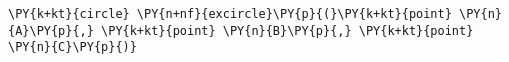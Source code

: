 \begin{Verbatim}[commandchars=\\\{\}]
    \PY{k+kt}{circle} \PY{n+nf}{excircle}\PY{p}{(}\PY{k+kt}{point} \PY{n}{A}\PY{p}{,} \PY{k+kt}{point} \PY{n}{B}\PY{p}{,} \PY{k+kt}{point} \PY{n}{C}\PY{p}{)}
\end{Verbatim}
